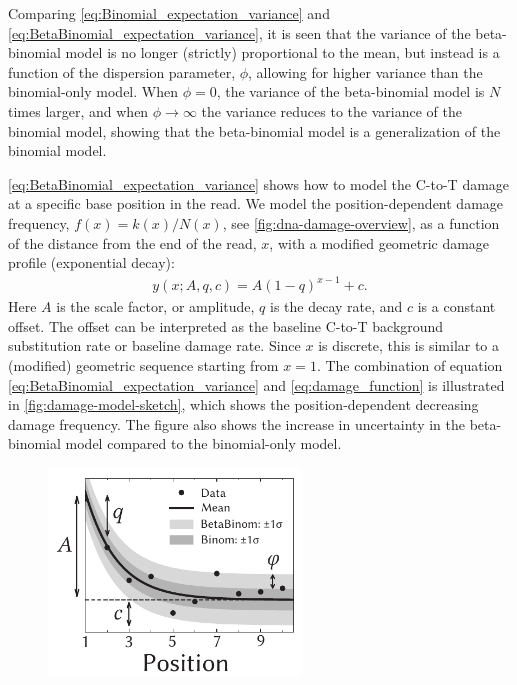 Comparing \autoref{eq:Binomial_expectation_variance} and \autoref{eq:BetaBinomial_expectation_variance}, it is seen that the variance of the beta-binomial model is no longer (strictly) proportional to the mean, but instead is a function of the dispersion parameter, $\phi$, allowing for higher variance than the binomial-only model. When $\phi = 0$, the variance of the beta-binomial model is $N$ times larger, and when $\phi \rightarrow \infty$ the variance reduces to the variance of the binomial model, showing that the beta-binomial model is a generalization of the binomial model.

\autoref{eq:BetaBinomial_expectation_variance} shows how to model the C-to-T damage at a specific base position in the read. We model the position-dependent damage frequency, $f(x) = k(x) / N(x)$, see \autoref{fig:dna-damage-overview}, as a function of the distance from the end of the read, $x$, with a modified geometric damage profile (exponential decay):
\begin{align}
    y(x; A, q, c) = A(1-q)^{x-1} + c.
    \label{eq:damage_function}
\end{align}
Here $A$ is the scale factor, or amplitude, $q$ is the decay rate, and $c$ is a constant offset. The offset can be interpreted as the baseline C-to-T background substitution rate or baseline damage rate. Since $x$ is discrete, this is similar to a (modified) geometric sequence starting from $x=1$. The combination of equation \eqref{eq:BetaBinomial_expectation_variance} and \eqref{eq:damage_function} is illustrated in \autoref{fig:damage-model-sketch}, which shows the position-dependent decreasing damage frequency. The figure also shows the increase in uncertainty in the beta-binomial model compared to the binomial-only model.
\begin{figure}[htbp]
    \centering
    \includegraphics[width=0.6\textwidth]{figures/damage_sketch_new.pdf}
\end{figure}

